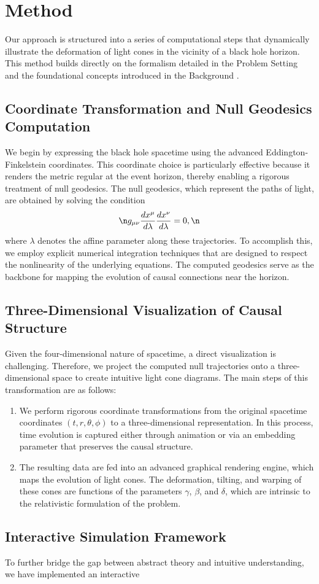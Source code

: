 \documentclass{article}
\begin{document}
\section{Method}\n \n Our approach is structured into a series of computational steps that dynamically illustrate the deformation of light cones in the vicinity of a black hole horizon. This method builds directly on the formalism detailed in the Problem Setting and the foundational concepts introduced in the Background \cite{Reference1,Reference2,Reference3,Reference4}.\n \n \subsection{Coordinate Transformation and Null Geodesics Computation}\n \n We begin by expressing the black hole spacetime using the advanced Eddington-Finkelstein coordinates. This coordinate choice is particularly effective because it renders the metric regular at the event horizon, thereby enabling a rigorous treatment of null geodesics. The null geodesics, which represent the paths of light, are obtained by solving the condition\n \begin{equation}\n   g_{\mu\nu}\frac{dx^\mu}{d\lambda}\frac{dx^\nu}{d\lambda} = 0, \n \end{equation}\n where $\lambda$ denotes the affine parameter along these trajectories. To accomplish this, we employ explicit numerical integration techniques that are designed to respect the nonlinearity of the underlying equations. The computed geodesics serve as the backbone for mapping the evolution of causal connections near the horizon.\n \n \subsection{Three-Dimensional Visualization of Causal Structure}\n \n Given the four-dimensional nature of spacetime, a direct visualization is challenging. Therefore, we project the computed null trajectories onto a three-dimensional space to create intuitive light cone diagrams. The main steps of this transformation are as follows:\n \begin{enumerate}\n   \item We perform rigorous coordinate transformations from the original spacetime coordinates $(t,r,\theta,\phi)$ to a three-dimensional representation. In this process, time evolution is captured either through animation or via an embedding parameter that preserves the causal structure.\n   \item The resulting data are fed into an advanced graphical rendering engine, which maps the evolution of light cones. The deformation, tilting, and warping of these cones are functions of the parameters $\gamma$, $\beta$, and $\delta$, which are intrinsic to the relativistic formulation of the problem.\n \end{enumerate}\n \n \subsection{Interactive Simulation Framework}\n \n To further bridge the gap between abstract theory and intuitive understanding, we have implemented an interactive 
\end{document}
